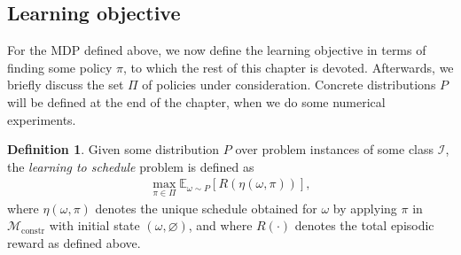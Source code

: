 \documentclass[a4paper]{report}
\theoremstyle{definition}
\newtheorem{define}{Definition}[chapter]
\theoremstyle{plain}
\newtheorem*{remark}{Remark}
\begin{document}

\subsection{Learning objective}

For the MDP defined above, we now define the learning objective in terms of
finding some policy $\pi$, to which the rest of this chapter is devoted.
%
Afterwards, we briefly discuss the set $\Pi$ of policies under consideration.
Concrete distributions $P$ will be defined at the end of the chapter, when we do
some numerical experiments.

\begin{mdframed}[%
  innertopmargin=0.3em,
  innerbottommargin=0.9em,
  skipabove=1.5em,
  skipbelow=4em,
]
  \begin{define}
    Given some distribution $P$ over problem instances of some class
    $\mathcal{I}$, the \emph{learning to schedule} problem is defined as
    \begin{align}\label{eq:MDP}
      \tag{MDP}
      \max_{\pi \in \Pi} \mathbb{E}_{\omega \sim P} [R(\eta(\omega, \pi))] ,
    \end{align}
    where $\eta(\omega, \pi)$ denotes the unique schedule obtained for $\omega$ by applying
    $\pi$ in $\mathcal{M}_\mathrm{constr}$ with initial state $(\omega, \varnothing)$, and where
    $R(\cdot)$ denotes the total episodic reward as defined above.
  \end{define}
\end{mdframed}
\end{document}
